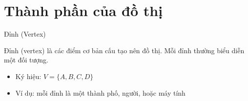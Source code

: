 \section{Thành phần của đồ thị}

\begin{frame}{Đỉnh (Vertex)}
\begin{tcolorbox}[colback=blue!5,colframe=mainblue,title=Khái niệm]
Đỉnh (vertex) là các điểm cơ bản cấu tạo nên đồ thị.  
Mỗi đỉnh thường biểu diễn một đối tượng.
\end{tcolorbox}

\vspace{0.5cm}

\begin{itemize}
\item Ký hiệu: $V = \{A, B, C, D\}$
\item Ví dụ: mỗi đỉnh là một thành phố, người, hoặc máy tính
\end{itemize}

\vspace{0.5cm}

\centering
{}

\end{frame}

